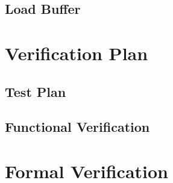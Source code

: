 

\subsection{Load Buffer}

\section{Verification Plan}
\subsection{Test Plan}
\subsection{Functional Verification}

\section{Formal Verification}

